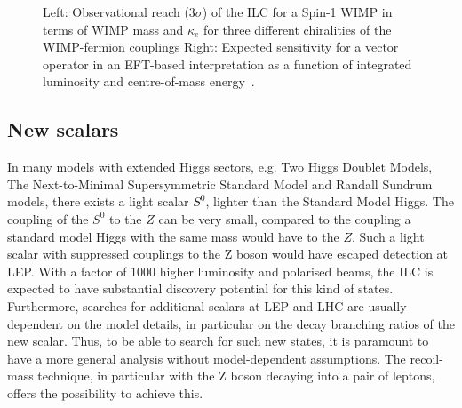 \begin{figure}[]
\setlength{\unitlength}{1.0cm}
\hspace{0.05cm}
\caption{\label{fig:searches_WIMPs} Left: Observational reach ($3\sigma$) of the ILC for a Spin-1 
  WIMP in terms of WIMP
  mass and $\kappa_e$ for three different chiralities of the WIMP-fermion couplings
   Right: Expected sensitivity for a vector operator in an EFT-based interpretation as a function of integrated
  luminosity and centre-of-mass energy~\cite{Habermehl:417605}.}
\end{figure}

\subsection{New scalars}
\label{subsec:searches_newscalars}

In many models with extended Higgs sectors, e.g.
Two Higgs Doublet Models, The Next-to-Minimal Supersymmetric  Standard  Model
and  Randall  Sundrum  models,  there  exists  a  light  scalar
$S^0$,
lighter than the Standard Model Higgs.
The coupling of the $S^0$ to the $Z$ can be very small,
compared to the coupling a standard model Higgs with the
same mass would have
to the $Z$.
Such a light scalar with suppressed couplings to the Z boson would
have escaped detection at LEP.
With a factor of 1000 higher luminosity and polarised beams,
the ILC is expected to have substantial discovery potential for
this kind of states.
Furthermore,
searches for additional scalars at LEP and LHC are usually dependent on the
model details,
in particular on the decay branching ratios of the new scalar.
Thus, to be able to search for such new states,
it is paramount to have a more general analysis without
model-dependent assumptions.
The recoil-mass technique,
in particular with the Z boson decaying into a pair of leptons,
offers the possibility to achieve this.

